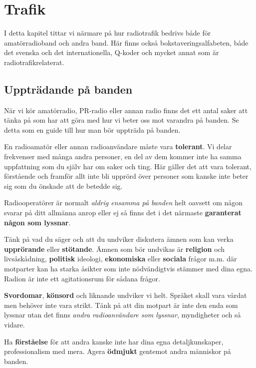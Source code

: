 
\chapter{Trafik}

I detta kapitel tittar vi närmare på hur radiotrafik bedrivs både för
amatörradioband och andra band. Här finns också bokstaveringsalfabeten, både
det svenska och det internationella, Q-koder och mycket annat som är
radio\-trafik\-relaterat.

\vfill \minitoc

\clearpage

\section{Uppträdande på banden}

När vi kör amatörradio, PR-radio eller annan radio finns det ett antal saker
att tänka på som har att göra med hur vi beter oss mot varandra på banden. Se
detta som en guide till hur man bör uppträda på banden.

En radioamatör eller annan radioanvändare måste vara \textbf{tolerant}. Vi
delar frekvenser med många andra personer, en del av dem kommer inte ha samma
uppfattning som du själv har om saker och ting. Här gäller det att vara
tolerant, förstående och framför allt inte bli upprörd över personer som
kanske inte beter sig som du önskade att de betedde sig.

Radiooperatörer är normalt \emph{aldrig ensamma på banden} helt oavsett om
någon svarar på ditt allmänna anrop eller ej så finns det i det närmaste
\textbf{garanterat någon som lyssnar}.

Tänk på vad du säger och att du undviker diskutera ämnen som kan verka
\textbf{upprörande} eller \textbf{stötande}. Ämnen som bör undvikas är
\textbf{religion} och livs\-å\-skå\-d\-ni\-ng, \textbf{politisk} ideologi,
\textbf{ekonomiska} eller \textbf{sociala} frågor m.m. där motparter kan ha
starka åsikter som inte nödvändigtvis stämmer med dina egna. Radion är inte
ett agitationsrum för sådana frågor.

\textbf{Svordomar}, \textbf{könsord} och liknande undviker vi helt. Språket
skall vara vårdat men behöver inte vara strikt. Tänk på att din motpart är
inte den enda som lyssnar utan det finns \textit{andra radioanvändare som
lyssnar}, myndigheter och så vidare.

Ha \textbf{förståelse} för att andra kanske inte har dina egna
detaljkunskaper, professionalism med mera. Agera \textbf{ödmjukt} gentemot
andra människor på banden.

